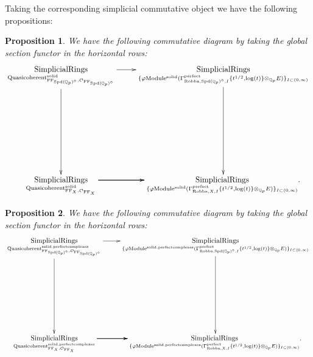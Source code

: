 \documentclass[12pt]{book}
\newtheorem{proposition}{Proposition}
\theoremstyle{definition}
\begin{document}
\indent Taking the corresponding simplicial commutative object we have the following propositions:

\begin{proposition}
We have the following commutative diagram by taking the global section functor in the horizontal rows:
\[\displayindent=+0in
\xymatrix@R+7pc{
\underset{\mathrm{Quasicoherent}^{\mathrm{solid}}_{\mathrm{FF}_{\mathrm{Spd}(\mathbb{Q}_p)^\diamond},\mathcal{O}_{\mathrm{FF}_{\mathrm{Spd}(\mathbb{Q}_p)^\diamond}}}}{\mathrm{SimplicialRings}} \ar[d] \ar[r] &\underset{\{\varphi\mathrm{Module}^{\mathrm{solid}}(\Gamma^\text{perfect}_{\text{Robba},{\mathrm{Spd}(\mathbb{Q}_p)^\diamond},I}\{t^{1/2},\log(t)\}\otimes_{\mathbb{Q}_p}E)\}_{I\subset (0,\infty)}}{\mathrm{SimplicialRings}} \ar[d]\\
\underset{\mathrm{Quasicoherent}^{\mathrm{solid}}_{\mathrm{FF}_X,\mathcal{O}_{\mathrm{FF}_X}}}{\mathrm{SimplicialRings}}  \ar[r] \ar[r] \ar[r] &\underset{\{\varphi\mathrm{Module}^{\mathrm{solid}}(\Gamma^\text{perfect}_{\text{Robba},X,I}\{t^{1/2},\log(t)\}\otimes_{\mathbb{Q}_p}E)\}_{I\subset (0,\infty)}}{\mathrm{SimplicialRings}}.
}
\]
\end{proposition}

\begin{proposition}
We have the following commutative diagram by taking the global section functor in the horizontal rows:
\[\displayindent=+0in
\xymatrix@C+0in@R+7pc{
\underset{\mathrm{Quasicoherent}^{\mathrm{solid,perfectcomplexes}}_{\mathrm{FF}_{\mathrm{Spd}(\mathbb{Q}_p)^\diamond},\mathcal{O}_{\mathrm{FF}_{\mathrm{Spd}(\mathbb{Q}_p)^\diamond}}}}{\mathrm{SimplicialRings}}\ar[d] \ar[r] &\underset{\{\varphi\mathrm{Module}^{\mathrm{solid,perfectcomplexes}}(\Gamma^\text{perfect}_{\text{Robba},{\mathrm{Spd}(\mathbb{Q}_p)^\diamond},I}\{t^{1/2},\log(t)\}\otimes_{\mathbb{Q}_p}E)\}_{I\subset (0,\infty)}}{\mathrm{SimplicialRings}}\ar[d]\\
\underset{\mathrm{Quasicoherent}^{\mathrm{solid,perfectcomplexes}}_{\mathrm{FF}_X,\mathcal{O}_{\mathrm{FF}_X}}}{\mathrm{SimplicialRings}}  \ar[r] \ar[r] \ar[r] &\underset{\{\varphi\mathrm{Module}^{\mathrm{solid,perfectcomplexes}}(\Gamma^\text{perfect}_{\text{Robba},X,I}\{t^{1/2},\log(t)\}\otimes_{\mathbb{Q}_p}E)\}_{I\subset (0,\infty)}}{\mathrm{SimplicialRings}}.  
}
\]
\end{proposition}
\end{document}
